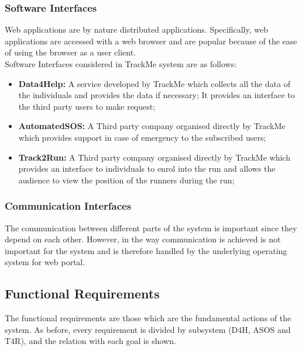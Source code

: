 \documentclass[12pt]{article}
\begin{document}
\subsubsection{Software Interfaces}
Web applications are by nature distributed applications. Specifically, web applications are accessed with a web browser and are popular because of the ease of using the browser as a user client.\\
Software Interfaces considered in TrackMe system are as follows:
\begin{itemize}
\item{} \textbf{Data4Help:} A service developed by TrackMe which collects all the data of the individuals and provides the data if necessary; It provides an interface to the third party users to make request;
\item{} \textbf{AutomatedSOS:} A Third party company organised directly by TrackMe which provides support in case of emergency to the subscribed users;
\item{} \textbf{Track2Run:} A Third party company organised directly by TrackMe which provides an interface to individuals to enrol into the run and allows the audience to view the position of the runners during the run;
\end{itemize}
\subsubsection{Communication Interfaces}
The communication between different parts of the system is important since they depend on each other. However, in the way communication is achieved is not important for the system and is therefore handled by the underlying operating system for web portal.
\subsection{Functional Requirements}
The functional requirements are those which are the fundamental actions of the system. As before, every requirement is divided by subsystem (D4H, ASOS and T4R), and the relation with each goal is shown.
\end{document}
